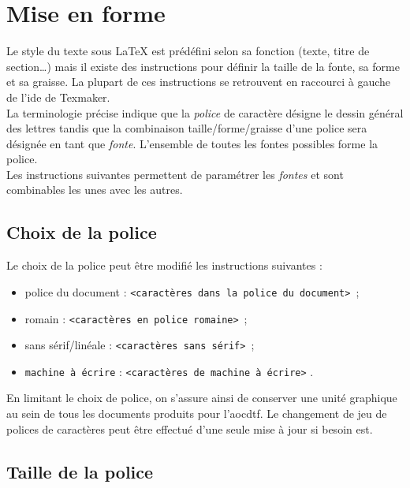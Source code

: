 \documentclass[a4paper, 11pt, twoside, fleqn]{memoir}
\begin{document}
\section{Mise en forme}

	Le style du texte sous \LaTeX{} est prédéfini selon sa fonction (texte, titre de section\ldots) mais il existe des instructions pour définir la taille de la fonte, sa forme et sa graisse. La plupart de ces instructions se retrouvent en raccourci à gauche de l'\gls{ide} de Texmaker.\\
	La terminologie précise indique que la \emph{police} de caractère désigne le dessin général des lettres tandis que la combinaison taille/forme/graisse d'une police sera désignée en tant que \emph{fonte}. L'ensemble de toutes les fontes possibles forme la police.\\ 
	Les instructions suivantes permettent de paramétrer les \emph{fontes} et sont combinables les unes avec les autres.
	
	\subsection{Choix de la police}

	Le choix de la police peut être modifié les instructions suivantes :

		\begin{itemize}
	\item \textnormal{police du document} : \texttt{\textnormal{<caractères dans la police du document>}} \,;
	\item \textrm{romain} : \texttt{\textrm{<caractères en police romaine>}} \,;
	\item \textsf{sans sérif/linéale} : \texttt{\textsf{<caractères sans sérif>}} \,;
	\item \texttt{machine à écrire} : \texttt{\texttt{<caractères de machine à écrire>}} .\\
		\end{itemize}	

	En limitant le choix de police, on s'assure ainsi de conserver une unité graphique au sein de tous les documents produits pour l'\gls{aocdtf}. Le changement de jeu de polices de caractères peut être effectué d'une seule mise à jour si besoin est.
	
	\subsection{Taille de la police}
	
\end{document}
